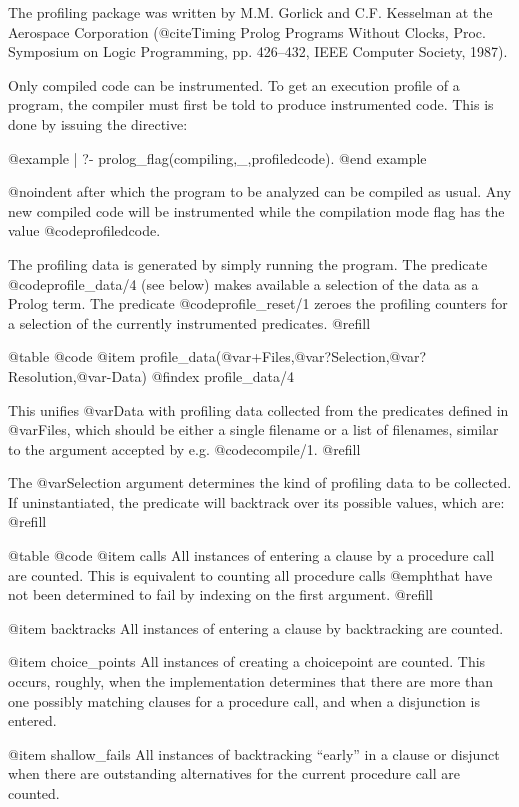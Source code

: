 The profiling package was written by M.M. Gorlick and C.F. Kesselman at
the Aerospace Corporation (@cite{Timing Prolog Programs Without Clocks},
Proc. Symposium on Logic Programming, pp. 426--432, IEEE Computer
Society, 1987).

Only compiled code can be instrumented.  To get an execution profile of
a program, the compiler must first be told to produce instrumented code.
This is done by issuing the directive:

@example
| ?- prolog_flag(compiling,_,profiledcode).
@end example

@noindent
after which the program to be analyzed can be compiled as usual.  Any
new compiled code will be instrumented while the compilation mode flag
has the value @code{profiledcode}.

The profiling data is generated by simply running the program.  The
predicate @code{profile_data/4} (see below) makes available a selection
of the data as a Prolog term.  The predicate @code{profile_reset/1}
zeroes the profiling counters for a selection of the currently
instrumented predicates. @refill


@table @code
@item profile_data(@var{+Files},@var{?Selection},@var{?Resolution},@var{-Data})
@findex profile_data/4

This unifies @var{Data} with profiling data collected from the
predicates defined in @var{Files}, which should be either a single
filename or a list of filenames, similar to the argument accepted by
e.g. @code{compile/1}. @refill

The @var{Selection} argument determines the kind of profiling data to be
collected.  If uninstantiated, the predicate will backtrack over its
possible values, which are: @refill

@table @code
@item calls
All instances of entering a clause by a procedure call are counted.
This is equivalent to counting all procedure calls @emph{that have not
been determined to fail by indexing on the first argument}. @refill

@item backtracks
All instances of entering a clause by backtracking are counted.

@item choice_points
All instances of creating a choicepoint are counted.  This occurs,
roughly, when the implementation determines that there are more than one
possibly matching clauses for a procedure call, and when a disjunction
is entered.

@item shallow_fails
All instances of backtracking ``early'' in a clause or disjunct when
there are outstanding alternatives for the current procedure call are
counted.


